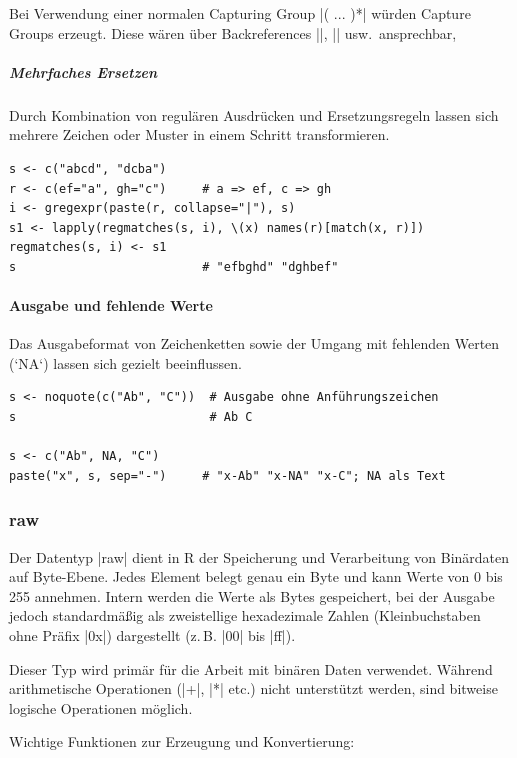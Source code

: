 \documentclass[10pt,twocolumn]{scrartcl}
\renewcommand{\lstinline}{\mycoloredinline}
\begin{document}
Bei Verwendung einer normalen Capturing Group \lstinline|( ... )*| würden Capture Groups erzeugt. Diese wären über Backreferences \lstinline|\1|,  \lstinline|\2| usw.\ ansprechbar,

\subparagraph{Mehrfaches Ersetzen}

Durch Kombination von regulären Ausdrücken und Ersetzungsregeln lassen sich mehrere Zeichen oder Muster in einem Schritt transformieren.

\begin{lstlisting}
s <- c("abcd", "dcba")
r <- c(ef="a", gh="c")     # a => ef, c => gh
i <- gregexpr(paste(r, collapse="|"), s)
s1 <- lapply(regmatches(s, i), \(x) names(r)[match(x, r)])
regmatches(s, i) <- s1
s                          # "efbghd" "dghbef"
\end{lstlisting}

\paragraph{Ausgabe und fehlende Werte}

Das Ausgabeformat von Zeichenketten sowie der Umgang mit fehlenden Werten (`NA`) lassen sich gezielt beeinflussen.

\begin{lstlisting}
s <- noquote(c("Ab", "C"))  # Ausgabe ohne Anführungszeichen
s                           # Ab C

s <- c("Ab", NA, "C")
paste("x", s, sep="-")     # "x-Ab" "x-NA" "x-C"; NA als Text
\end{lstlisting}


\subsubsection{raw}

Der Datentyp \lstinline|raw| dient in R der Speicherung und Verarbeitung von Binärdaten auf Byte-Ebene. Jedes Element belegt genau ein Byte und kann Werte von 0 bis 255 annehmen. Intern werden die Werte als Bytes gespeichert, bei der Ausgabe jedoch standardmäßig als zweistellige hexadezimale Zahlen (Kleinbuchstaben ohne Präfix \lstinline|0x|) dargestellt (z.\,B. \lstinline|00| bis \lstinline|ff|).

Dieser Typ wird primär für die Arbeit mit binären Daten verwendet. Während arithmetische Operationen (\lstinline|+|, \lstinline|*| etc.) nicht unterstützt werden, sind bitweise logische Operationen möglich.

Wichtige Funktionen zur Erzeugung und Konvertierung:
\end{document}
